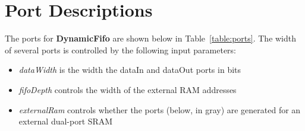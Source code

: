 \section{Port Descriptions}

The ports for \textbf{DynamicFifo} are shown below in 
Table~\ref{table:ports}. The width of several ports is controlled 
by the following input parameters:

\begin{itemize}[noitemsep]
  \item \textit{dataWidth} is the width the dataIn and dataOut ports in bits
  \item \textit{fifoDepth} controls the width of the external RAM addresses
  \item \textit{externalRam} controls whether the ports (below, in gray) are 
    generated for an external dual-port SRAM
\end{itemize}
 
